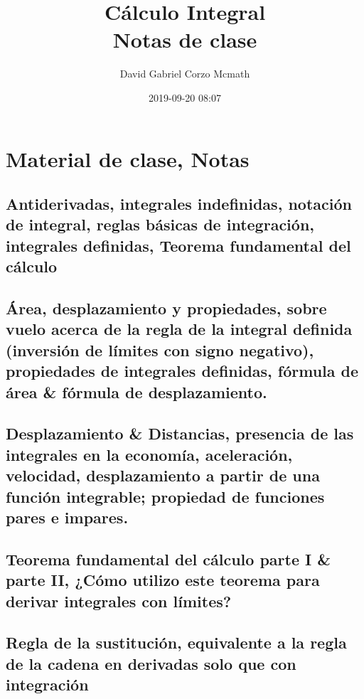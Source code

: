 \documentclass[openany]{book}
\author{David Gabriel Corzo Mcmath}
\title{\huge Cálculo Integral \normalsize \\ Notas de clase }
\date{2019-09-20 08:07}
\begin{document}
\maketitle
\tableofcontents


\part{Material de clase, Notas}

\chapter{Antiderivadas, integrales indefinidas, notación de integral, reglas básicas de integración, integrales definidas, Teorema fundamental del cálculo}




\chapter{Área, desplazamiento y propiedades, sobre vuelo acerca de la regla de la integral definida (inversión de límites con signo negativo), propiedades de integrales definidas, fórmula de área \& fórmula de desplazamiento.}



\chapter{Desplazamiento \& Distancias, presencia de las integrales en la economía, aceleración, velocidad, desplazamiento a partir de una función integrable; propiedad de funciones pares e impares.}



\chapter{Teorema fundamental del cálculo parte I \& parte II, ¿Cómo utilizo este teorema para derivar integrales con límites?}



\chapter{Regla de la sustitución, equivalente a la regla de la cadena en derivadas solo que con integración}

\end{document}
